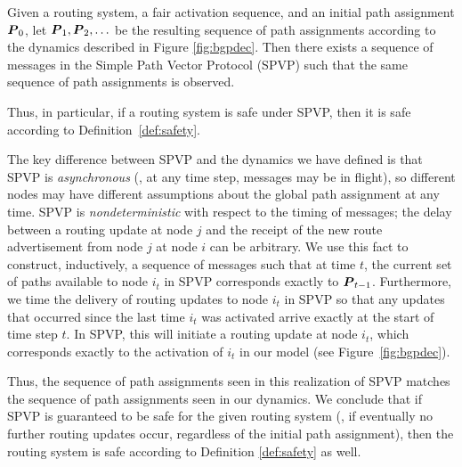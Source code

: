 \begin{prop}%
\label{prop:griffin}
Given a routing system, a fair activation sequence, and an initial
path assignment $\boldsymbol{P}_0$, let $\boldsymbol{P}_1, \boldsymbol{P}_2, \ldots$ be the
resulting sequence of path assignments according to the dynamics
described in Figure \ref{fig:bgpdec}.  Then there exists a sequence of
messages in the Simple Path Vector Protocol (SPVP) such that the same
sequence of path assignments is observed.

Thus, in particular, if a routing system is safe under SPVP, then it is
safe according to Definition~\ref{def:safety}.
\end{prop}

\begin{proofsketch}
The key difference between SPVP and the dynamics we have defined is
that SPVP is {\em asynchronous} (\ie, at any time step, messages may
be in flight), so different nodes may have different assumptions about
the global path assignment at any time.  SPVP is {\em
nondeterministic} with respect to the timing of messages; the delay
between a routing update at node $j$ and the receipt of the new route
advertisement from node $j$ at node $i$ can be arbitrary.  We
use this fact to construct, inductively, a sequence of messages
such that at time $t$, the current set of paths available to node
$i_t$ in SPVP corresponds exactly to $\boldsymbol{P}_{t-1}$.  Furthermore, we time
the delivery of routing updates to node $i_t$ in SPVP so that any
updates that occurred since the last time $i_t$ was activated arrive
exactly at the start of time step $t$.  In SPVP, this will initiate a
routing update at node $i_t$, which corresponds exactly to the
activation of $i_t$ in our model (see Figure~\ref{fig:bgpdec}).

Thus, the sequence of path assignments seen in this realization of SPVP
 matches the sequence of path assignments seen in our dynamics.  We
conclude that if SPVP is guaranteed to be safe for the
given routing system (\ie, if eventually no further routing updates
occur, regardless of the initial path assignment), then the routing
system is safe according to Definition \ref{def:safety} as well.
\end{proofsketch}



